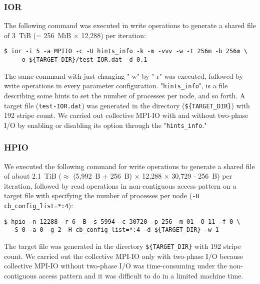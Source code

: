 \documentclass{jhps}
\begin{document}
\subsubsection{IOR}

The following command was executed in write operations to generate
a shared file of 3~TiB (= 256~MiB $\times$ 12,288) per iteration:
%
\begin{verbatim}
$ ior -i 5 -a MPIIO -c -U hints_info -k -m -vvv -w -t 256m -b 256m \
    -o ${TARGET_DIR}/test-IOR.dat -d 0.1
\end{verbatim}
%
The same command with just changing "-w" by "-r" was executed,
followed by write operations in every parameter configuration.
"{\tt hints\_info}", is a file describing some hints to set the number of processes per node,
and so forth.
A target file ({\tt test-IOR.dat}) was generated in the directory
({\tt \$\{TARGET\_DIR\}})
with 192 stripe count.
We carried out collective MPI-IO with and without two-phase I/O by enabling
or disabling its option through the "{\tt hints\_info}."
%
%

\subsubsection{HPIO}

We executed the following command for write operations to generate
a shared file of about 2.1~TiB ($\approx$ (5,992~B + 256~B) $\times$ 12,288 $\times$ 30,729 - 256~B)
per iteration, followed by read operations in non-contiguous access pattern
on a target file with specifying the number of processes per node ({\tt -H cb\_config\_list=*:4}):
%
\begin{verbatim}
$ hpio -n 12288 -r 6 -B -s 5994 -c 30720 -p 256 -m 01 -O 11 -f 0 \
  -S 0 -a 0 -g 2 -H cb_config_list=*:4 -d ${TARGET_DIR} -w 1
\end{verbatim}
%
The target file was generated in the directory {\tt \$\{TARGET\_DIR\}}
with 192 stripe count. We carried out the collective MPI-IO
only with two-phase I/O because collective MPI-IO without two-phase I/O was
time-consuming under the non-contiguous access pattern and
it was difficult to do in a limited machine time.
\end{document}
